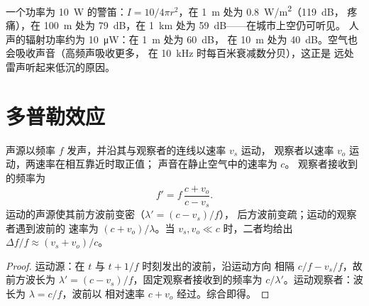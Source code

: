 \begin{example}[警笛与交谈]\label{ex:b2:sound-waves:siren}
一个功率为 \qty{10}{W} 的警笛：$I = 10/4\pi r^2$，在 \qty{1}{m} 处为 \qty{0.8}{W/m^2}（\qty{119}{dB}，
疼痛），在 \qty{100}{m} 处为 \qty{79}{dB}，在 \qty{1}{km} 处为 \qty{59}{dB}——在城市上空仍可听见。
人声的辐射功率约为 \qty{10}{\micro W}：在 \qty{1}{m} 处为 \qty{60}{dB}，
在 \qty{10}{m} 处为 \qty{40}{dB}。空气也会吸收声音（高频声吸收更多，
在 \qty{10}{kHz} 时每百米衰减数分贝），这正是
远处雷声听起来低沉的原因。
\end{example}

\section{多普勒效应}

\begin{theorem}[多普勒效应]\label{thm:b2:sound-waves:doppler}
声源以频率 $f$ 发声，并沿其与观察者的连线以速率 $v_s$ 运动，
观察者以速率 $v_o$ 运动，两速率在相互靠近时取正值；
声音在静止空气中的速率为 $c$。
观察者接收到的频率为
\[
f' = f\,\frac{c + v_o}{c - v_s} .
\]
运动的声源使其前方波前变密（$\lambda' = (c - v_s)/f$），
后方波前变疏；运动的观察者遇到波前的
速率为 $(c + v_o)/\lambda$。当 $v_s, v_o \ll c$ 时，二者均给出 $\Delta f/f \approx
(v_s + v_o)/c$。
\end{theorem}

\begin{proof}
运动源：在 $t$ 与 $t + 1/f$ 时刻发出的波前，沿运动方向
相隔 $c/f - v_s/f$，故前方波长为
$\lambda' = (c - v_s)/f$，固定观察者接收到的频率为
$c/\lambda'$。运动观察者：波长为 $\lambda = c/f$，波前以
相对速率 $c + v_o$ 经过。综合即得。
\end{proof}

